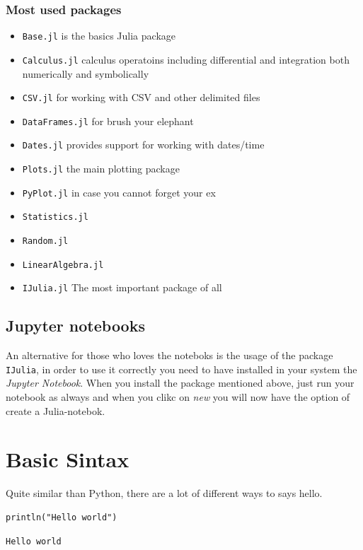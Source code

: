 \documentclass[11pt]{article}
\begin{document}
\subsubsection{Most used packages}
\label{sec:org3d70fb0}

\begin{itemize}
\item \texttt{Base.jl} is the basics Julia package
\item \texttt{Calculus.jl} calculus operatoins including differential and integration both numerically and symbolically
\item \texttt{CSV.jl} for working with CSV and other delimited files
\item \texttt{DataFrames.jl} for brush your elephant
\item \texttt{Dates.jl} provides support for working with dates/time
\item \texttt{Plots.jl} the main plotting package
\item \texttt{PyPlot.jl} in case you cannot forget your ex
\item \texttt{Statistics.jl}
\item \texttt{Random.jl}
\item \texttt{LinearAlgebra.jl}
\item \texttt{IJulia.jl} The most important package of all
\end{itemize}

\subsection{Jupyter notebooks}
\label{sec:org2ffac97}
An alternative for those who loves the noteboks is the usage of the package \texttt{IJulia}, in order to use it correctly you need to have installed in your system the \emph{Jupyter Notebook}. When you install the package mentioned above, just run your notebook as always and when you clikc on \emph{new} you will now have the option of create a Julia-notebok.

\section{Basic Sintax}
\label{sec:orgc34e4a2}
Quite similar than Python, there are a lot of different ways to says hello.

\begin{verbatim}
println("Hello world")
\end{verbatim}

\begin{verbatim}
Hello world
\end{verbatim}
\end{document}

